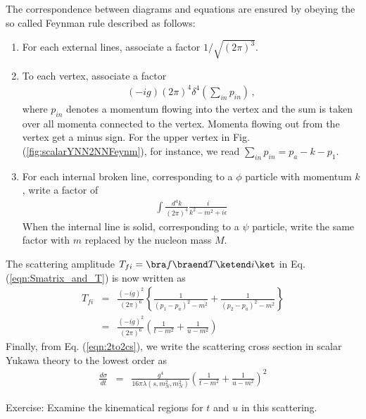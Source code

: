 The correspondence between diagrams and equations are ensured by obeying
the so called Feynman rule described as follows:

\begin{enumerate}
\item For each external lines, associate a factor $1/\sqrt{(2\pi)^3}$.

\item To each vertex, associate a factor
\begin{eqnarray}
(-ig) (2\pi)^4 \delta^4(\sum_{in} p_{in})\,,
\end{eqnarray}
where $p_{in}$ denotes a momentum flowing into the vertex and the sum is taken
over all momenta connected to the vertex. Momenta flowing out from the vertex get
a minus sign. For the upper vertex in Fig. (\ref{fig:scalarYNN2NNFeynm}), for instance,
we read $\sum_{in} p_{in} = p_a - k - p_1$.

\item For each internal broken line, corresponding to a $\phi$ particle with momentum $k$,
write a factor of
\begin{eqnarray}
\int \frac{d^4 k}{(2\pi)^4} \frac{i}{k^2 - m^2 + i\epsilon}
\end{eqnarray}
When the internal line is solid, corresponding to a $\psi$ particle, write the same factor
with $m$ replaced by the nucleon mass $M$.
\end{enumerate}

The scattering amplitude $T_{fi} = \bra f \braend T \ketend i \ket$ 
in Eq. (\ref{eqn:Smatrix_and_T}) is now
written as
\begin{eqnarray}
T_{fi}
&=&
\frac{(-i g)^2}{(2\pi)^6} 
\left\{
\frac{1}{(p_1 - p_a)^2 - m^2}
+
\frac{1}{(p_2 - p_a)^2 - m^2}
\right\}
\nonumber\\
&=&
\frac{(-i g)^2}{(2\pi)^6} 
\left(
\frac{1}{t - m^2}
+
\frac{1}{u - m^2}
\right)
\end{eqnarray}
Finally, from Eq. (\ref{eqn:2to2cs}), we write the scattering cross section 
in scalar Yukawa theory to the lowest order as
\begin{eqnarray}
\frac{d \sigma}{dt}
&=&
\frac{g^4}{16\pi \lambda(s, m_N^2,m_N^2)}
\left(
\frac{1}{t - m^2} + \frac{1}{u - m^2}
\right)^2
\end{eqnarray}

\bigskip

\noindent
{}
Exercise\theexercise:
Examine the kinematical regions for $t$ and $u$ in this scattering.

\bigskip

